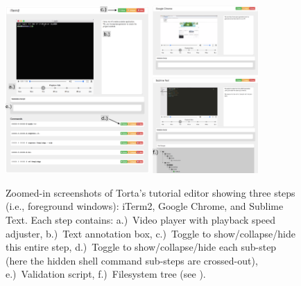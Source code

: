 \begin{figure}[h!]

\includegraphics[width=0.488\textwidth]{figures/torta/editor-iterm2.png}
\hspace{6em}
\includegraphics[width=0.362\textwidth]{figures/torta/editor-sublime-chrome.png}

\caption{Zoomed-in screenshots of Torta's tutorial editor showing three
steps (i.e., foreground windows): iTerm2, Google Chrome, and Sublime
Text. Each step contains:
a.)~Video player with playback speed adjuster,
b.)~Text annotation box,
c.)~Toggle to show/collapse/hide this entire step,
d.)~Toggle to show/collapse/hide each sub-step (here the hidden shell command
sub-steps are crossed-out),
e.)~Validation script,
f.)~Filesystem tree (see ).}

\label{fig:torta-editor}
\end{figure}



